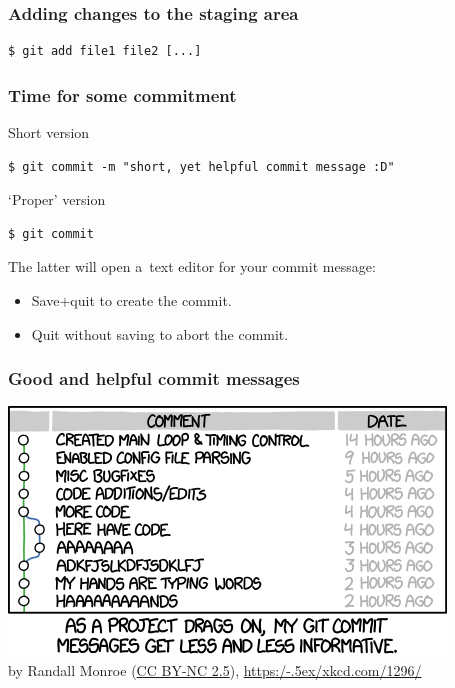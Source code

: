 \documentclass[12pt]{beamer}
\begin{document}
\begin{frame}[fragile]
  \frametitle{Adding changes to the staging area}

  {\footnotesize{}%
    \begin{verbatim}
$ git add file1 file2 [...]
    \end{verbatim}%
  }
\end{frame}

\begin{frame}[fragile]
  \frametitle{Time for some commitment}

  \begin{block}{Short version}
    {\footnotesize{}%
      \begin{verbatim}
$ git commit -m "short, yet helpful commit message :D"
      \end{verbatim}%
    }
  \end{block}

  \begin{block}{`Proper' version}
    {\footnotesize{}%
      \begin{verbatim}
$ git commit
      \end{verbatim}%
    }
  \end{block}

  The latter will open a~text editor for your commit message:
  \begin{itemize}
    \item Save$+$quit to create the commit.
    \item Quit without saving to abort the commit.
  \end{itemize}
\end{frame}

\begin{frame}
  \frametitle{Good and helpful commit messages}

  \begin{center}
    {\tiny{}%
      \includegraphics[width=.5\textwidth]{images/xkcd-git-commit.png}\\%
      by Randall Monroe
      (\href{https://creativecommons.org/licenses/by-nc/2.5/}{CC BY-NC 2.5}),
      \href{https://xkcd.com/1296/}{https:/\kern-.5ex/xkcd.com/1296/}
      \par%
    }
  \end{center}
\end{frame}
\end{document}

